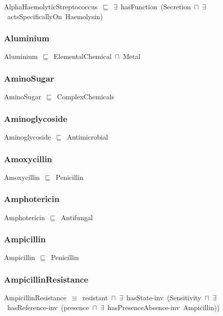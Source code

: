 \documentclass{article}
\begin{document}
AlphaHaemolyticStreptococcus~\ensuremath{\sqsubseteq}~\ensuremath{\exists}~hasFunction~(Secretion~\ensuremath{\sqcap}~\ensuremath{\exists}~actsSpecificallyOn~Haemolysin)~

\subsubsection*{Aluminium}

Aluminium~\ensuremath{\sqsubseteq}~ElementalChemical~\ensuremath{\sqcap}~Metal~

\subsubsection*{AminoSugar}

AminoSugar~\ensuremath{\sqsubseteq}~ComplexChemicals~

\subsubsection*{Aminoglycoside}

Aminoglycoside~\ensuremath{\sqsubseteq}~Antimicrobial~

\subsubsection*{Amoxycillin}

Amoxycillin~\ensuremath{\sqsubseteq}~Penicillin~

\subsubsection*{Amphotericin}

Amphotericin~\ensuremath{\sqsubseteq}~Antifungal~

\subsubsection*{Ampicillin}

Ampicillin~\ensuremath{\sqsubseteq}~Penicillin~

\subsubsection*{AmpicillinResistance}

AmpicillinResistance~\ensuremath{\equiv}~resistant~\ensuremath{\sqcap}~\ensuremath{\exists}~hasState-inv~(Sensitivity~\ensuremath{\sqcap}~\ensuremath{\exists}~hasReference-inv~(presence~\ensuremath{\sqcap}~\ensuremath{\exists}~hasPresenceAbsence-inv~Ampicillin))
\end{document}
